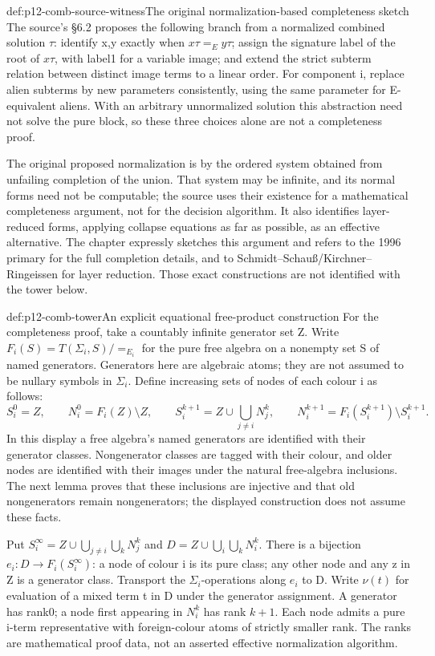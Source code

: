 \begin{hbmethod}{def:p12-comb-source-witness}{The original normalization-based completeness sketch}
The source's \S6.2 proposes the following branch from a normalized
combined solution \(\tau\): identify x,y exactly when
\(x\tau=_Ey\tau\); assign the signature label of the root of
\(x\tau\), with label1 for a variable image; and extend the strict
subterm relation between distinct image terms to a linear order.
For component i, replace alien subterms by new parameters consistently,
using the same parameter for E-equivalent aliens. With an arbitrary
unnormalized solution this abstraction need not solve the pure block,
so these three choices alone are not a completeness proof.

The original proposed normalization is by the ordered system obtained
from unfailing completion of the union. That system may be infinite,
and its normal forms need not be computable; the source uses their
existence for a mathematical completeness argument, not for the
decision algorithm. It also identifies layer-reduced forms, applying
collapse equations as far as possible, as an effective alternative.
The chapter expressly sketches this argument and refers to the
1996 primary for the full completion details, and to
Schmidt--Schau\ss/Kirchner--Ringeissen for layer reduction.
Those exact constructions are not identified with the tower below.
\cite[pp.~518--519]{BaaderSnyder2001}
\end{hbmethod}

\begin{hbdefinition}{def:p12-comb-tower}{An explicit equational free-product construction}
For the completeness proof, take a countably infinite generator set Z.
Write \(F_i(S)=T(\Sigma_i,S)/{=_{E_i}}\) for the pure free algebra on
a nonempty set S of named generators. Generators here are algebraic
atoms; they are not assumed to be nullary symbols in \(\Sigma_i\).
Define increasing sets of nodes of each colour i as follows:
\[
 S_i^0=Z,\qquad
 N_i^0=F_i(Z)\setminus Z,\qquad
 S_i^{k+1}=Z\cup\bigcup_{j\ne i}N_j^k,\qquad
 N_i^{k+1}=F_i(S_i^{k+1})\setminus S_i^{k+1}.
\]
In this display a free algebra's named generators are identified with
their generator classes. Nongenerator classes are tagged with their
colour, and older nodes are identified with their images under the
natural free-algebra inclusions. The next lemma proves that these
inclusions are injective and that old nongenerators remain nongenerators;
the displayed construction does not assume these facts.

Put \(S_i^\infty=Z\cup\bigcup_{j\ne i}\bigcup_kN_j^k\) and
\(D=Z\cup\bigcup_i\bigcup_kN_i^k\). There is a bijection
\(e_i:D\longrightarrow F_i(S_i^\infty)\): a node of colour i is
its pure class; any other node and any z in Z is a generator class.
Transport the \(\Sigma_i\)-operations along \(e_i\) to D.
Write \(\nu(t)\) for evaluation of a mixed term t in D under the
generator assignment. A generator has rank0; a node first appearing
in \(N_i^k\) has rank \(k+1\). Each node admits a pure i-term
representative with foreign-colour atoms of strictly smaller rank.
The ranks are mathematical proof data, not an asserted effective
normalization algorithm.
\end{hbdefinition}

